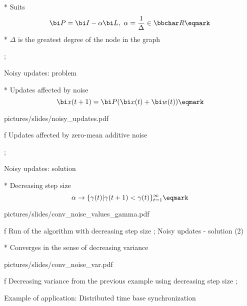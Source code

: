 * Suits $${\bi P} = {\bi I} - \alpha {\bi L}, \ \alpha = {{1}\over{\Delta}} \in \bbchar R \eqmark $$
\begitems
* $\Delta$ is the greatest degree of the node in the graph
\enditems

\pg;



\sec Noisy updates: problem

* Updates affected by noise $$ {\bi x}(t+1) = {\bi P} ({\bi x}(t)+{\bi w}(t)) \eqmark$$


\centerline{\hsize \inspic pictures/slides/noisy_updates.pdf } 
\caption/f Updates affected by zero-mean additive noise


\pg;



\sec Noisy updates: solution


* Decreasing step size \nl $$\alpha \rightarrow \{ \gamma(t) | \gamma(t+1)<\gamma(t)  \}_{t=1}^\infty \eqmark$$


\centerline{\picw=14cm \inspic pictures/slides/conv_noise_values_gamma.pdf } 
\caption/f Run of the algorithm with decreasing step size
\pg;
\sec Noisy updates - solution (2)


* Converges in the sense of decreasing variance

\centerline{\picw=14cm \inspic pictures/slides/conv_noise_var.pdf } 
\caption/f Decreasing variance from the previous example using decreasing step size
\pg;










\sec Example of application: \nl  Distributed time base synchronization 

